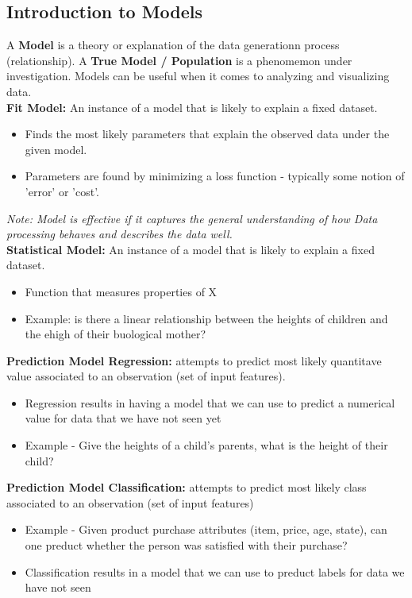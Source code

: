 \documentclass[english, 10pt]{article}
\begin{document}
\subsection{Introduction to Models}
A \textbf{Model} is a theory or explanation of the data generationn process (relationship). A \textbf{True Model / Population} is a phenomemon under investigation. Models can be useful when it comes to analyzing and visualizing data. \\
\textbf{Fit Model:} An instance of a model that is likely to explain a fixed dataset. 
\begin{itemize}
	\item Finds the most likely parameters that explain the observed data under the given model.
	\item Parameters are found by minimizing a loss function - typically some notion of 'error' or 'cost'.
\end{itemize} 
\textit{Note: Model is effective if it captures the general understanding of how Data processing behaves and describes the data well.} \\

\textbf{Statistical Model:} An instance of a model that is likely to explain a fixed dataset. 
\begin{itemize}
	\item Function that measures properties of X
	\item Example: is there a linear relationship between the heights of children and the ehigh of their buological mother?
\end{itemize}

\textbf{Prediction Model Regression:} attempts to predict most likely quantitave value associated to an observation (set of input features).
\begin{itemize}
	\item Regression results in having a model that we can use to predict a numerical value for data that we have not seen yet
	\item Example - Give the heights of a child's parents, what is the height of their child?
\end{itemize}

\textbf{Prediction Model Classification:} attempts to predict most likely class associated to an observation (set of input features)
\begin{itemize}
	\item Example - Given product purchase attributes (item, price, age, state), can one preduct whether the person was satisfied with their purchase?
	\item Classification results in a model that we can use to preduct labels for data we have not seen
\end{itemize}
\end{document}
